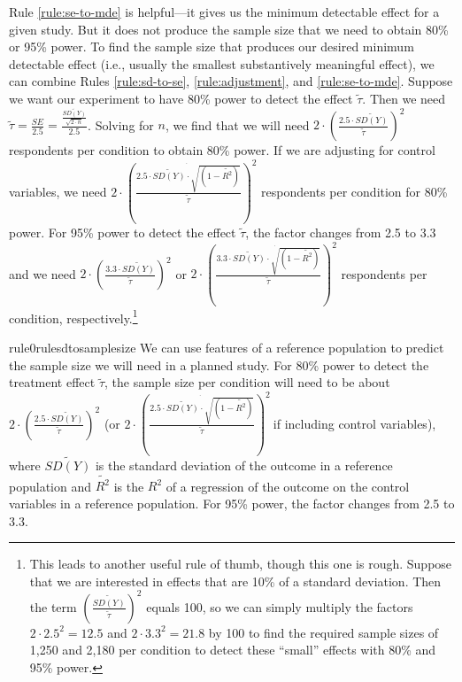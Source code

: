 \documentclass[12pt]{article}
\begin{document}
Rule \ref{rule:se-to-mde} is helpful---it gives us the minimum detectable effect for a given study.
But it does not produce the sample size that we need to obtain 80\% or 95\% power. 
To find the sample size that produces our desired minimum detectable effect (i.e., usually the smallest substantively meaningful effect), we can combine Rules \ref{rule:sd-to-se}, \ref{rule:adjustment}, and \ref{rule:se-to-mde}. 
Suppose we want our experiment to have 80\% power to detect the effect $\widetilde{\tau}$.
Then we need $\widetilde{\tau} = \frac{SE}{2.5} = \frac{\frac{\widetilde{SD(Y)}}{\sqrt{2 \cdot n}}}{2.5}$.
Solving for $n$, we find that we will need $2 \cdot \left( \frac{2.5 \cdot \widetilde{SD(Y)}}{\widetilde{\tau}} \right)^{2}$ respondents per condition to obtain 80\% power. 
If we are adjusting for control variables, we need $2 \cdot \left( \frac{\dot{2.5 \cdot \widetilde{SD(Y)} \cdot \sqrt{\left( 1 - \widetilde{R^{2}} \right)}}}{\widetilde{\tau}} \right)^{2}$ respondents per condition for 80\% power. For 95\% power to detect the effect $\widetilde{\tau}$, the factor changes from 2.5 to 3.3 and we need $2 \cdot \left( \frac{3.3 \cdot \widetilde{SD(Y)}}{\widetilde{\tau}} \right)^{2}$ or $2 \cdot \left( \frac{3.3 \cdot \dot{\widetilde{SD(Y)} \cdot \sqrt{\left( 1 - \widetilde{R^2} \right)}}}{\widetilde{\tau}} \right)^{2}$ respondents per condition, respectively.\footnote{This leads to another useful rule of thumb, though this one is rough. Suppose that we are interested in effects that are 10\% of a standard deviation. Then the term $\left( \frac{\widetilde{SD(Y)}}{\widetilde{\tau}} \right)^{2}$ equals 100, so we can simply multiply the factors $2 \cdot {2.5}^{2} = 12.5$ and $2 \cdot {3.3}^{2} = 21.8$ by 100 to find the required sample sizes of 1,250 and 2,180 per condition to detect these ``small'' effects with 80\% and 95\% power.}

\begin{restatable}{rule0}{rulesdtosamplesize}
\label{rule:sd-to-sample-size}
We can use features of a reference population to predict the sample size we will need in a planned study. 
For 80\% power to detect the treatment effect $\widetilde{\tau}$, the sample size per condition will need to be about $2 \cdot \left( \frac{2.5 \cdot \widetilde{SD(Y)}}{\widetilde{\tau}} \right)^{2}$ (or $2 \cdot \left( \frac{\dot{2.5 \cdot \widetilde{SD(Y)} \cdot \sqrt{\left( 1 - \widetilde{R^{2}} \right)}}}{\widetilde{\tau}} \right)^{2}\ $if including control variables), where $\widetilde{SD(Y)}$ is the standard deviation of the outcome in a reference population and $\widetilde{R^2}$ is the $R^2$ of a regression of the outcome on the control variables in a reference population.
For 95\% power, the factor changes from 2.5 to 3.3.
\end{restatable}
\end{document}
